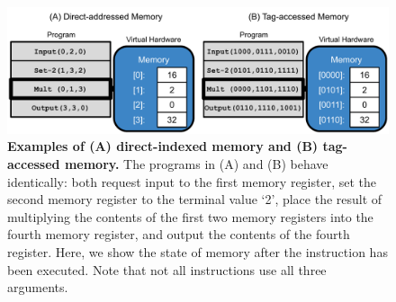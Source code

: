 \begin{figure}
  \includegraphics[width=1.0\columnwidth]{chapters/06-tag-access-memory/media/memory-access-overview.pdf}
  \caption{\small 
  \textbf{Examples of (A) direct-indexed memory and (B) tag-accessed memory. }
  The programs in (A) and (B) behave identically: both request input to the first memory register, set the second memory register to the terminal value `2', place the result of multiplying the contents of the first two memory registers into the fourth memory register, and output the contents of the fourth register.
  Here, we show the state of memory after the  instruction has been executed. 
  Note that not all instructions use all three arguments.
  }
  \label{chapter:tag-accessed-memory:fig:memory-access-overview}
\end{figure}